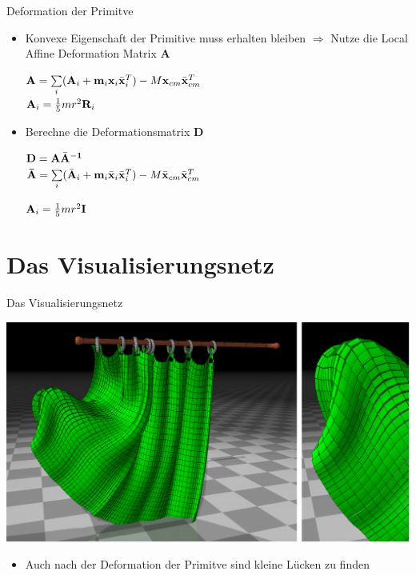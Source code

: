 \documentclass[t]{beamer}
\begin{document}
	\begin{frame}{Deformation der Primitve}
		\begin{itemize}
			\item Konvexe Eigenschaft der Primitive muss erhalten bleiben
					$\Rightarrow$ Nutze die Local Affine Deformation Matrix $\mathbf{A}$
					\begin{center}
						$\mathnormal{\mathbf{A}}=\sum\limits_{\mathnormal{i}}(\mathnormal{\mathbf{A}_i}+\mathnormal{\mathbf{m}_i \mathbf{x}_i \mathbf{\bar{x}}_i^T})-M\mathnormal{\mathbf{x}_{cm} \mathbf{\bar{x}}_{cm}^T}$ \\
						$\mathnormal{\mathbf{A}_{i}}=\frac{1}{5}mr^2\mathbf{R}_\mathnormal{i}$
					\end{center}
			\item Berechne die Deformationsmatrix \textbf{D}
				\begin{center}
					$\mathnormal{\mathbf{D}}=\mathnormal{\mathbf{A \bar{A}^{-1}}}$ \\
					$\mathbf{\bar{A}}=\sum\limits_{\mathnormal{i}}(\mathnormal{\mathbf{\bar{A}}_i+\mathbf{m}_i\mathbf{\bar{x}}_i\mathbf{\bar{x}}_i^T})-M\mathnormal{\mathbf{\bar{x}}_{cm} \mathbf{\bar{x}}_{cm}^T}$
				\end{center}
				\begin{center}
					$\mathnormal{\mathbf{A}_{i}}=\frac{1}{5}mr^2\mathbf{I}$
				\end{center}
		\end{itemize}
	\end{frame}
	
	\section{Das Visualisierungsnetz}
	\begin{frame}{Das Visualisierungsnetz}
		\begin{center}
			\includegraphics[scale = 0.275]{Curtain_2.png}
		\end{center}
		\begin{itemize}
			\item Auch nach der Deformation der Primitve sind kleine Lücken zu finden
		\end{itemize}
	\end{frame}
	
\end{document}
